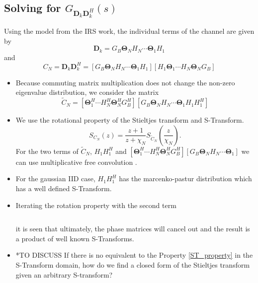 \documentclass[12pt,a4paper]{article}
\begin{document}
\subsection{Solving for $G_{\mathbf{D}_{k}\mathbf{D}_{k}^H}(s)$}\label{Polynomial_terms}
Using the model from the IRS work, the individual terms of the channel are given by
\begin{equation}
\mathbf{D}_{k} = G_B \boldsymbol{\Theta}_N H_N \cdots \boldsymbol{\Theta}_1 H_1
\end{equation}
and 
\begin{equation}
C_N = \mathbf{D}_{k}\mathbf{D}_{k}^H = [G_B \boldsymbol{\Theta}_N H_N \cdots \boldsymbol{\Theta}_1 H_1]
[H_1 \boldsymbol{\Theta}_1 \cdots H_N \boldsymbol{\Theta}_N G_B]
\end{equation}
\begin{itemize}
\item 
	Because commuting matrix multiplication does not change the non-zero eigenvalue distribution, we consider 
	the matrix 
\begin{equation}
\tilde{C}_N = [\boldsymbol{\Theta}_1^H \cdots H_N^H \boldsymbol{\Theta}_N^H G_B^H][G_B \boldsymbol{\Theta}_N H_N \cdots \boldsymbol{\Theta}_1 H_1 H_1^H]
\end{equation}

\item 
	We use the rotational property of the Stieltjes transform and S-Transform. 
\begin{equation}
S_{C_N}(z) = \frac{z+1}{z+\chi_N} S_{\tilde{C}_N}(\frac{z}{\chi_N}).
\end{equation}
For the two terms of $\tilde{C}_N$, 
$ H_1 H_1^H$ and $[\boldsymbol{\Theta}_1^H \cdots H_N^H \boldsymbol{\Theta}_N^H G_B^H][G_B \boldsymbol{\Theta}_N H_N \cdots \boldsymbol{\Theta}_1]$
we can use multiplicative free convolution .

\item
	For the gaussian IID case, $ H_1 H_1^H$  has the marcenko-pastur distribution which has a well defined S-Transform. 

\item 
	Iterating the rotation property with the second term 
	\begin{equation}
	[\boldsymbol{\Theta}_1^H H_2 \cdots H_N^H \boldsymbol{\Theta}_N^H G_B^H]
	[G_B \boldsymbol{\Theta}_N H_N  \cdots H_2^H \boldsymbol{\Theta}_1]
	\end{equation}
	
	\begin{equation}
	[ \boldsymbol{\Theta}_N H_N  \cdots H_2^H \boldsymbol{\Theta}_1]
	[\boldsymbol{\Theta}_1^H H_2 \cdots H_N^H \boldsymbol{\Theta}_N^H G_B^H G_B]
	\end{equation}
	
	 it is seen that ultimately, the phase matrices will cancel out and the result is a product of well known S-Transforms.


\item 
*TO DISCUSS If there is no equivalent to the Property \ref{ST_property} in the S-Transform domain, how do we 
find a closed form of the Stieltjes transform given an arbitrary S-transform?
\end{itemize}
\end{document}
